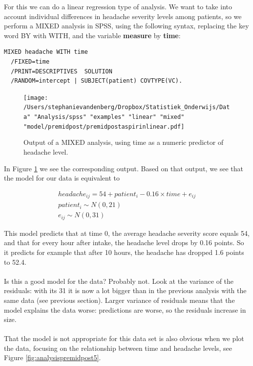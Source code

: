 \documentclass[]{report}\usepackage[]{graphicx}\usepackage[]{color}
\begin{document}
For this we can do a linear regression type of analysis. We want to take into account individual differences in headache severity levels among patients, so we perform a MIXED analysis in SPSS, using the following syntax, replacing the key word BY with WITH, and the variable \textbf{measure} by \textbf{time}:

\begin{verbatim}
MIXED headache WITH time
  /FIXED=time
  /PRINT=DESCRIPTIVES  SOLUTION
  /RANDOM=intercept | SUBJECT(patient) COVTYPE(VC).
\end{verbatim}




\begin{figure}[h]
\label{fig:premidpostaspirinlinear}
    \begin{center}
       \texttt{[image: /Users/stephanievandenberg/Dropbox/Statistiek\_Onderwijs/Data" "Analysis/spss" "examples" "linear" "mixed" "model/premidpost/premidpostaspirinlinear.pdf]}
    \end{center}
    \caption{Output of a MIXED analysis, using time as a numeric predictor of headache level.}
\end{figure}


In Figure \ref{fig:premidpostaspirinlinear} we see the corresponding output. Based on that output, we see that the model for our data is equivalent to


\begin{eqnarray}
headache_{ij} = 54 + patient_i - 0.16 \times time + e_{ij} \\
patient_i \sim N(0, 21)\\
e_{ij} \sim N(0, 31)
\end{eqnarray}

This model predicts that at time 0, the average headache severity score equals 54, and that for every hour after intake, the headache level drops by 0.16 points. So it predicts for example that after 10 hours, the headache has dropped 1.6 points to 52.4. 
\\
\\
Is this a good model for the data? Probably not. Look at the variance of the residuals: with its 31 it is now a lot bigger than in the previous analysis with the same data (see previous section). Larger variance of residuals means that the model explains the data worse: predictions are worse, so the residuals increase in size. 
\\
\\
That the model is not appropriate for this data set is also obvious when we plot the data, focusing on the relationship between time and headache levels, see Figure \ref{fig:analysispremidpost5}. 
\end{document}
